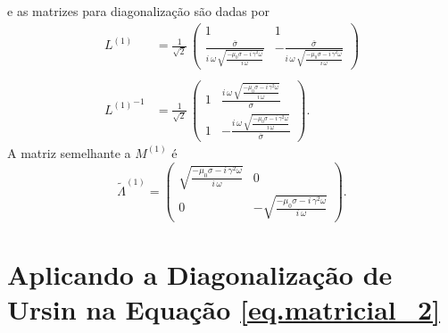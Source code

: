 e as matrizes para diagonaliza\c{c}\~ao s\~ao dadas por
\begingroup
\Large
\begin{align*}
L^{(1)}&=\frac{1}{\sqrt{2}}\,
\begin{pmatrix}
1&1\\
\frac{\overline{\sigma}}{i\,\omega\,\sqrt{\frac{-\mu_0\sigma-i\,\gamma^2\omega}{i\,\omega}}}&-\frac{\overline{\sigma}}{i\,\omega\,\sqrt{\frac{-\mu_0\sigma-i\,\gamma^2\omega}{i\,\omega}}}
\end{pmatrix}\\\\
{L^{(1)}}^{-1}&=\frac{1}{\sqrt{2}}\,
\begin{pmatrix}
1&\frac{i\,\omega\,\sqrt{\frac{-\mu_0\sigma-i\,\gamma^2\omega}{i\,\omega}}}{\overline{\sigma}}\\
1&-\frac{i\,\omega\,\sqrt{\frac{-\mu_0\sigma-i\,\gamma^2\omega}{i\,\omega}}}{\overline{\sigma}}
\end{pmatrix}.
\end{align*}
\endgroup
A matriz semelhante a $M^{(1)}$ \'e
\begin{equation*}
\tilde{\Lambda}^{(1)}=
\begin{pmatrix}
\sqrt{\frac{-\mu_0\sigma-i\,\gamma^2\omega}{i\,\omega}}&0\\
0&-\sqrt{\frac{-\mu_0\sigma-i\,\gamma^2\omega}{i\,\omega}}
\end{pmatrix}.
\end{equation*}

\section{Aplicando a Diagonaliza\c{c}\~ao de Ursin na Equa\c{c}\~ao \ref{eq.matricial_2}}

